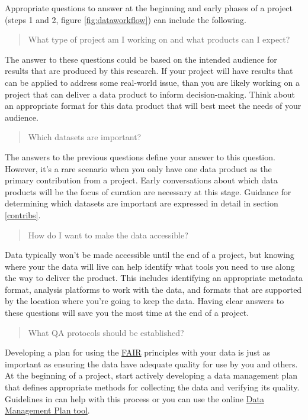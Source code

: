\documentclass[
]{book}
\begin{document}
Appropriate questions to answer at the beginning and early phases of a project (steps 1 and 2, figure \ref{fig:dataworkflow}) can include the following.

\begin{quote}
What type of project am I working on and what products can I expect?
\end{quote}

The answer to these questions could be based on the intended audience for results that are produced by this research. If your project will have results that can be applied to address some real-world issue, than you are likely working on a project that can deliver a data product to inform decision-making. Think about an appropriate format for this data product that will best meet the needs of your audience.

\begin{quote}
Which datasets are important?
\end{quote}

The answers to the previous questions define your answer to this question. However, it's a rare scenario when you only have one data product as the primary contribution from a project. Early conversations about which data products will be the focus of curation are necessary at this stage. Guidance for determining which datasets are important are expressed in detail in section \ref{contribs}.

\begin{quote}
How do I want to make the data accessible?
\end{quote}

Data typically won't be made accessible until the end of a project, but knowing where your the data will live can help identify what tools you need to use along the way to deliver the product. This includes identifying an appropriate metadata format, analysis platforms to work with the data, and formats that are supported by the location where you're going to keep the data. Having clear answers to these questions will save you the most time at the end of a project.

\begin{quote}
What QA protocols should be established?
\end{quote}

Developing a plan for using the \protect\hyperlink{fair}{FAIR} principles with your data is just as important as ensuring the data have adequate quality for use by you and others. At the beginning of a project, start actively developing a data management plan that defines appropriate methods for collecting the data and verifying its quality. Guidelines in \citet{Michener15} can help with this process or you can use the online \href{https://dmptool.org/}{Data Management Plan tool}.
\end{document}
